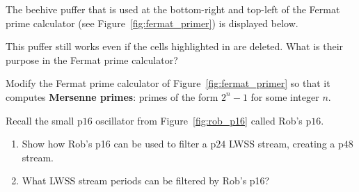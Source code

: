 \begin{multicols}{2}
	
	\mfilbreak
	
	
	\begin{problem}\label{exer:fermat_beehive_puffer} 
		The beehive puffer that is used at the bottom-right and top-left of the Fermat prime calculator (see Figure~\ref{fig:fermat_primer}) is displayed below.
		
		\begin{center}
		\end{center}
		
		\noindent This puffer still works even if the cells highlighted in  are deleted. What is their purpose in the Fermat prime calculator?
	\end{problem}


	\mfilbreak
	
	
	\begin{problem}\label{exer:mersenne_primer} 
		Modify the Fermat prime calculator of Figure~\ref{fig:fermat_primer} so that it computes \textbf{Mersenne primes}: primes of the form $2^n - 1$ for some integer $n$.
	\end{problem}
	
	
	\mfilbreak
	
	
	\begin{problem}\label{exer:robs_p16_smaller_p16_gun}
		Recall the small p$16$ oscillator from Figure~\ref{fig:rob_p16} called Rob's p$16$.\smallskip
		
		\begin{enumerate}[label=\bf\color{ocre}(\alph*)]
			\item {} Show how Rob's p16 can be used to filter a p$24$ LWSS stream, creating a p$48$ stream.
			
			\item {} What LWSS stream periods can be filtered by Rob's p16? %
			

\end{enumerate}
\end{problem}
\end{multicols}
